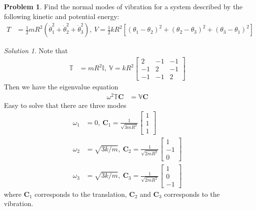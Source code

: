 \documentclass[twoside,11pt]{article}
\newcommand{\lms}{\fontfamily{lmss}\selectfont} %
\theoremstyle{definition}
\newtheorem{problem}{\lms Problem}
\theoremstyle{remark}
\newtheorem*{solution}{Solution}
\begin{document}
\begin{problem}
Find the normal modes of vibration for a system described by the following kinetic
and potential energy:
\begin{align*}
    T &= \frac{1}{2}mR^2 (\dot\theta_1^2 + \dot\theta_2^2 + \dot\theta_3^2),~
    V  = \frac{1}{2}kR^2[
    (\theta_1 - \theta_2)^2 + 
    (\theta_2 - \theta_3)^2 +
    (\theta_3 - \theta_1)^2
    ]
\end{align*}
\end{problem}
\begin{solution}
Note that
\begin{align*}
    \mathbb{T} &= mR^2\mathbb{I},~
    \mathbb{V}  = kR^2
    \begin{bmatrix}
        2 & -1 & -1\\
        -1 & 2 & -1\\
        -1 & -1 & 2
    \end{bmatrix}
\end{align*}
Then we have the eigenvalue equation
\begin{align*}
    \omega^2\mathbb{T}\mathbf{C} &=
    \mathbb{V}\mathbf{C}
\end{align*}
Easy to solve that there are three modes
\begin{align*}
    \omega_1 &=0,~\mathbf{C}_1 = \frac{1}{\sqrt{3mR^2}}
    \begin{bmatrix}
        1 \\ 1 \\ 1
    \end{bmatrix}\\
    \omega_2 &=\sqrt{3k/m},~\mathbf{C}_2 = \frac{1}{\sqrt{2mR^2}}
    \begin{bmatrix}
        1 \\ -1 \\ 0
    \end{bmatrix}\\
    \omega_3 &=\sqrt{3k/m},~\mathbf{C}_3 = \frac{1}{\sqrt{2mR^2}}
    \begin{bmatrix}
        1 \\ 0 \\ -1
    \end{bmatrix}
\end{align*}
where $\mathbf{C}_1$ corresponds to the translation,
$\mathbf{C}_2$ and $\mathbf{C}_3$ corresponds to the vibration.
\end{solution}
\end{document}
